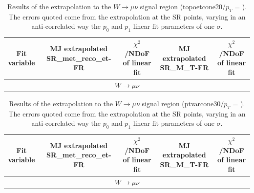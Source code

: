 \begin{table}[htbp]
\scriptsize
\begin{center}
 \begin{tabular}{ c | c  c | c  c } 
 \hline
Fit variable & MJ extrapolated SR\_met\_reco\_et-FR & $\chi^{2}$/NDoF of linear fit & MJ extrapolated SR\_M\_T-FR & $\chi^{2}$/NDoF of linear fit \\
\hline
\multicolumn{5}{c}{$W \rightarrow \mu \nu$} \\
 \hline
 \hline 
\end{tabular}
\caption{
Results of the extrapolation to the $W\rightarrow \mu\nu$ signal region (topoetcone20/$p_T$ = ). 
The errors quoted come from the extrapolation at the SR points, varying in an anti-correlated way the $p_0$ and $p_1$ linear fit parameters of one $\sigma$.
}%
\label{tbl:bkg_mj_wmu_scan_topoet}
\end{center}
\end{table}

\begin{table}[htbp]
\scriptsize
\begin{center}
 \begin{tabular}{ c | c  c | c  c } 
 \hline
Fit variable & MJ extrapolated SR\_met\_reco\_et-FR & $\chi^{2}$/NDoF of linear fit & MJ extrapolated SR\_M\_T-FR & $\chi^{2}$/NDoF of linear fit \\
\hline
\multicolumn{5}{c}{$W \rightarrow \mu \nu$} \\
 \hline
 \hline 
\end{tabular}
\caption{
Results of the extrapolation to the $W\rightarrow \mu\nu$ signal region (ptvarcone30/$p_T$ = ). 
The errors quoted come from the extrapolation at the SR points, varying in an anti-correlated way the $p_0$ and $p_1$ linear fit parameters of one $\sigma$.
}%
\label{tbl:bkg_mj_wmu_scan_ptvar}
\end{center}
\end{table}


